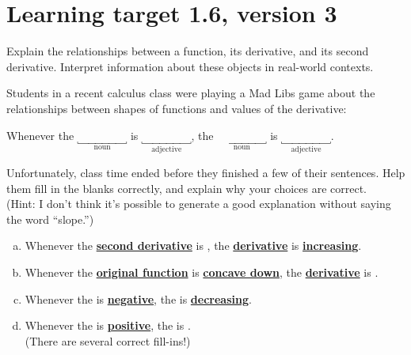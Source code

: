 \pagebreak

\section{Learning target 1.6, version 3}

Explain the relationships between a function, its derivative, and its second derivative. Interpret information about these objects in real-world contexts.

\hrulefill

Students in a recent calculus class were playing a Mad Libs game about the relationships between shapes of functions and values of the derivative:

\vspace{0.5em}
\begin{center}
    Whenever the 
    $\underbracket{\phantom{derivative}}_\text{noun}$ is
    $\underbracket{\phantom{derivative}}_\text{adjective}$,
    the 
    $\underbracket{\phantom{derivative}}_\text{noun}$ is
    $\underbracket{\phantom{derivative}}_\text{adjective}$.
\end{center}
\vspace{0.5em}

Unfortunately, class time ended before they finished a few of their sentences. Help them fill in the blanks correctly, and explain why your choices are correct. \\
(Hint: I don't think it's possible to generate a good explanation without saying the word ``slope.'')

\begin{enumerate}[(a)]
    \item Whenever the 
    \underline{\textbf{second derivative}} is
    \underline{\phantom{positive}}, the
    \underline{\textbf{derivative}} is
    \underline{\textbf{increasing}}.
    \vfill

    \item Whenever the 
    \underline{\textbf{original function}} is
    \underline{\textbf{concave down}}, the
    \underline{\textbf{derivative}} is
    \underline{\phantom{decreasing}}.
    \vfill

    \item Whenever the 
    \underline{\phantom{derivative}} is
    \underline{\textbf{negative}}, the
    \underline{\phantom{original function}} is
    \underline{\textbf{decreasing}}.
    \vfill

    \item Whenever the 
    \underline{\phantom{derivative}} is
    \underline{\textbf{positive}}, the
    \underline{\phantom{second derivative}} is
    \underline{\phantom{positive}}. \\
    (There are several correct fill-ins!)
    \vfill

\end{enumerate}
\vspace{-3em}

